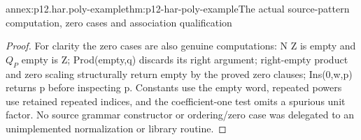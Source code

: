\begin{annexitem}{annex:p12.har.poly-example}{thm:p12-har-poly-example}{The actual source-pattern computation, zero cases and association qualification}
\begin{proof}
For clarity the zero cases are also genuine computations: N Z is
empty and \(Q_P\) empty is Z; Prod(empty,q) discards its right argument;
right-empty product and zero scaling structurally return empty by
the proved zero clauses; Ins(0,w,p) returns p before inspecting p.
Constants use the empty word, repeated powers use retained repeated
indices, and the coefficient-one test omits a spurious unit factor.
No source grammar constructor or ordering/zero case was delegated to
an unimplemented normalization or library routine.
\end{proof}
\end{annexitem}
